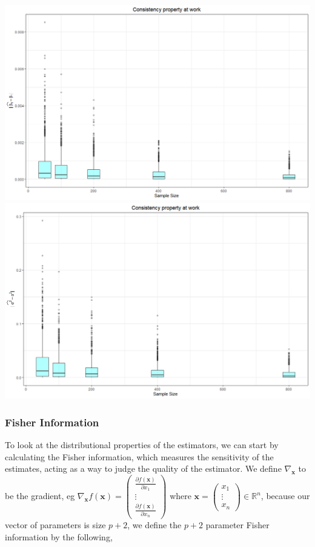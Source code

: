 \documentclass[honours,12pt]{unswthesis}
\numberwithin{equation}{section}
\begin{document}
\begin{center}
	\includegraphics[width = \textwidth]{graphics/samp800n1000b1_box.png}
	\includegraphics[width = \textwidth]{graphics/samp800n1000sigma_box.png}
\end{center}

\subsubsection{Fisher Information}

To look at the distributional properties of the estimators, we can start by calculating the Fisher information, which measures the sensitivity of the estimates, acting as a way to judge the quality of the estimator. We define $\nabla_{\mathbf{x}}$ to be the gradient, eg $\nabla_{\mathbf{x}} f(\mathbf{x}) = \begin{pmatrix} \frac{\partial f(\mathbf{x}) }{\partial x_{1}} \\ \vdots \\ \frac{\partial f(\mathbf{x}) }{\partial x_{n}} \end{pmatrix}$ where $\mathbf{x} = \begin{pmatrix} x_{1} \\ \vdots \\ x_{n} \end{pmatrix} \in \mathbb{R}^{n}$, because our vector of parameters is size $p+2$, we define the $p+2$ parameter Fisher information by the following,
\end{document}
